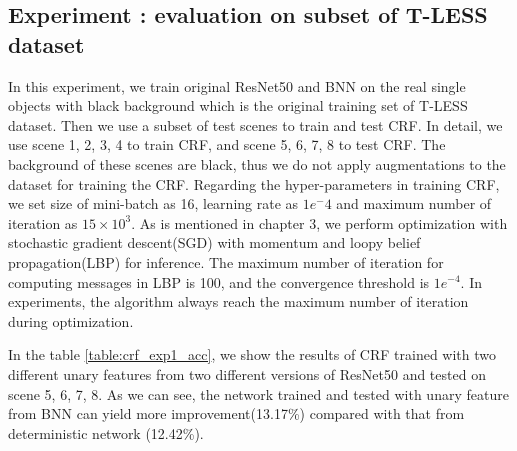 \subsection{Experiment : evaluation on subset of T-LESS dataset}
In this experiment, we train original ResNet50 and BNN on the real single objects with black background which is the original training set of T-LESS dataset. Then we use a subset of test scenes to train and test CRF. In detail, we use scene 1, 2, 3, 4 to train CRF, and scene 5, 6, 7, 8 to test CRF. The background of these scenes are black, thus we do not apply augmentations to the dataset for training the CRF. Regarding the hyper-parameters in training CRF, we set size of mini-batch as 16, learning rate as $1e^-4$ and maximum number of iteration as $15\times10^3$. As is mentioned in chapter 3, we perform optimization with stochastic gradient descent(SGD) with momentum and loopy belief propagation(LBP) for inference. The maximum number of iteration for computing messages in LBP is 100, and the convergence threshold is $1e^{-4}$. In experiments, the algorithm always reach the maximum number of iteration during optimization.

In the table \ref{table:crf_exp1_acc}, we show the results of CRF trained with two different unary features from two different versions of ResNet50 and tested on scene 5, 6, 7, 8. As we can see, the network trained and tested with unary feature from BNN can yield more improvement(13.17\%) compared with that from deterministic network (12.42\%).  

